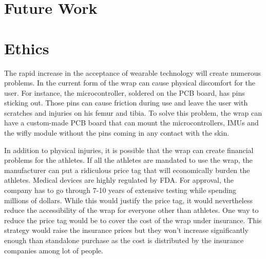 \documentclass{sig-alternate}
\begin{document}
\section{Future Work}
\label{sec:future_work}


\section{Ethics}
\label{sec:ethics}
The rapid increase in the acceptance of wearable technology will create numerous problems. In the current form of the wrap can cause physical discomfort for the user. For instance, the microcontroller, soldered on the PCB board, has pins sticking out. Those pins can cause friction during use and leave the user with scratches and injuries on his femur and tibia. To solve this problem, the wrap can have a custom-made PCB board that can mount the microcontrollers, IMUs and the wifly module without the pins coming in any contact with the skin.

In addition to physical injuries, it is possible that the wrap can create financial problems for the athletes. If all the athletes are mandated to use the wrap, the manufacturer can put a ridiculous price tag that will economically burden the athletes. Medical devices are highly regulated by FDA. For approval, the company has to go through 7-10 years of extensive testing while spending millions of dollars. While this would justify the price tag, it would nevertheless reduce the accessibility of the wrap for everyone other than athletes. One way to reduce the price tag would be to cover the cost of the wrap under insurance. This strategy would raise the insurance prices but they won’t increase significantly enough than standalone purchase as the cost is distributed by the insurance companies among lot of people.

\end{document}
